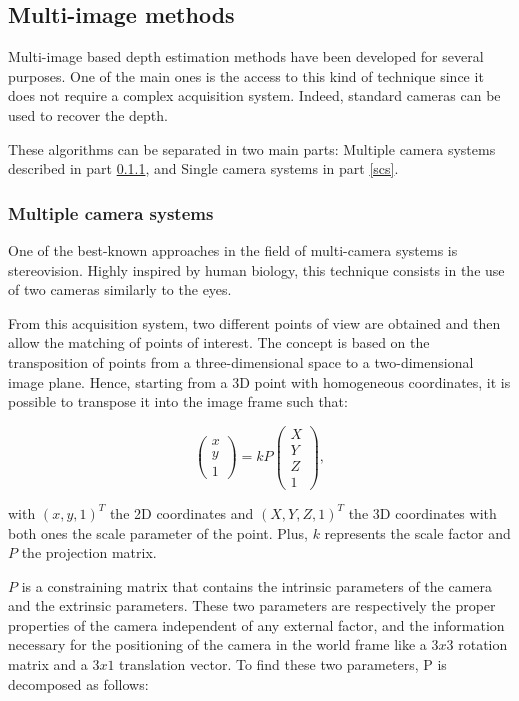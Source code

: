 \subsection{Multi-image methods}\label{multi-im}

Multi-image based depth estimation methods have been developed for several purposes. One of the main ones is the access to this kind of technique since it does not require a complex acquisition system. Indeed, standard cameras can be used to recover the depth. 

These algorithms can be separated in two main parts: Multiple camera systems described in part \ref{mcs}, and Single camera systems in part \ref{scs}.

\subsubsection{Multiple camera systems}\label{mcs}
One of the best-known approaches in the field of multi-camera systems is stereovision. Highly inspired by human biology\cite{marr1979computational}, this technique consists in the use of two cameras similarly to the eyes.

From this acquisition system, two different points of view are obtained and then allow the matching of points of interest. The concept is based on the transposition of points from a three-dimensional space to a two-dimensional image plane.
Hence, starting from a 3D point with homogeneous coordinates, it is possible to transpose it into the image frame such that:

\begin{equation}
	\begin{pmatrix}
	x \\ y \\ 1
	\end{pmatrix} = kP \begin{pmatrix}
	X \\ Y \\ Z \\ 1
	\end{pmatrix},
\end{equation}

with $(x,y,1)^T$ the 2D coordinates and $(X,Y,Z,1)^T$ the 3D coordinates with both ones the scale parameter of the point. Plus, $k$ represents the scale factor and $P$ the projection matrix.

$P$ is a constraining matrix that contains the intrinsic parameters of the camera and the extrinsic parameters. 
These two parameters are respectively the proper properties of the camera independent of any external factor, and the information necessary for the positioning of the camera in the world frame like a $3x3$ rotation matrix and a $3x1$ translation vector.
To find these two parameters, P is decomposed as follows:

